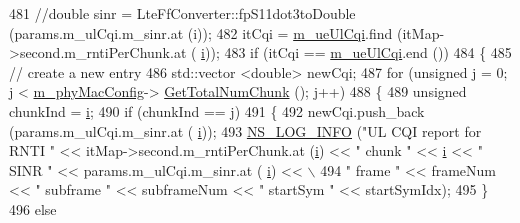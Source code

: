 \begin{DoxyCode}
481                                 \textcolor{comment}{//double sinr = LteFfConverter::fpS11dot3toDouble (params.m\_ulCqi.m\_sinr.at
       (i));}
482                                 itCqi = \hyperlink{classns3_1_1MmWaveFlexTtiMaxWeightMacScheduler_ab984a5ab7fb627aa66aac421719362c9}{m\_ueUlCqi}.find (itMap->second.m\_rntiPerChunk.at (
      \hyperlink{bernuolliDistribution_8m_a6f6ccfcf58b31cb6412107d9d5281426}{i}));
483                                 \textcolor{keywordflow}{if} (itCqi == \hyperlink{classns3_1_1MmWaveFlexTtiMaxWeightMacScheduler_ab984a5ab7fb627aa66aac421719362c9}{m\_ueUlCqi}.end ())
484                                 \{
485                                         \textcolor{comment}{// create a new entry}
486                                         std::vector <double> newCqi;
487                                         \textcolor{keywordflow}{for} (\textcolor{keywordtype}{unsigned} j = 0; j < \hyperlink{classns3_1_1MmWaveMacScheduler_a24d7af4971d2e500fe543cefbafa2fd9}{m\_phyMacConfig}->
      \hyperlink{classns3_1_1MmWavePhyMacCommon_a97e82c809a351fea9d5058ac1bb4c3c6}{GetTotalNumChunk} (); j++)
488                                         \{
489                                                 \textcolor{keywordtype}{unsigned} chunkInd = \hyperlink{bernuolliDistribution_8m_a6f6ccfcf58b31cb6412107d9d5281426}{i};
490                                                 \textcolor{keywordflow}{if} (chunkInd == j)
491                                                 \{
492                                                         newCqi.push\_back (params.m\_ulCqi.m\_sinr.at (
      \hyperlink{bernuolliDistribution_8m_a6f6ccfcf58b31cb6412107d9d5281426}{i}));
493                                                         \hyperlink{group__logging_gafbd73ee2cf9f26b319f49086d8e860fb}{NS\_LOG\_INFO} (\textcolor{stringliteral}{"UL CQI report for RNTI "} 
      << itMap->second.m\_rntiPerChunk.at (\hyperlink{bernuolliDistribution_8m_a6f6ccfcf58b31cb6412107d9d5281426}{i}) << \textcolor{stringliteral}{" chunk "} << \hyperlink{bernuolliDistribution_8m_a6f6ccfcf58b31cb6412107d9d5281426}{i} << \textcolor{stringliteral}{" SINR "} << params.m\_ulCqi.m\_sinr.at (
      \hyperlink{bernuolliDistribution_8m_a6f6ccfcf58b31cb6412107d9d5281426}{i}) << \(\backslash\)
494                                                                      \textcolor{stringliteral}{" frame "} << frameNum << \textcolor{stringliteral}{" subframe "} 
      << subframeNum << \textcolor{stringliteral}{" startSym "} << startSymIdx);
495                                                 \}
496                                                 \textcolor{keywordflow}{else}

\end{DoxyCode}
